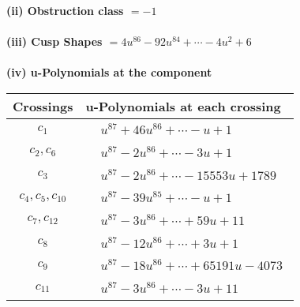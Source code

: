 \documentclass[1p]{elsarticle_modified}
\theoremstyle{definition}
\begin{document}
\flushleft \textbf{(ii) Obstruction class $= -1$}\\~\\
\flushleft \textbf{(iii) Cusp Shapes $= 4 u^{86}-92 u^{84}+\cdots-4 u^2+6$}\\~\\
\newpage\renewcommand{\arraystretch}{1}
\flushleft \textbf{(iv) u-Polynomials at the component}\newline \\
\begin{tabular}{m{50pt}|m{274pt}}
Crossings & \hspace{64pt}u-Polynomials at each crossing \\
\hline $$\begin{aligned}c_{1}\end{aligned}$$&$\begin{aligned}
&u^{87}+46 u^{86}+\cdots- u+1
\end{aligned}$\\
\hline $$\begin{aligned}c_{2},c_{6}\end{aligned}$$&$\begin{aligned}
&u^{87}-2 u^{86}+\cdots-3 u+1
\end{aligned}$\\
\hline $$\begin{aligned}c_{3}\end{aligned}$$&$\begin{aligned}
&u^{87}-2 u^{86}+\cdots-15553 u+1789
\end{aligned}$\\
\hline $$\begin{aligned}c_{4},c_{5},c_{10}\end{aligned}$$&$\begin{aligned}
&u^{87}-39 u^{85}+\cdots- u+1
\end{aligned}$\\
\hline $$\begin{aligned}c_{7},c_{12}\end{aligned}$$&$\begin{aligned}
&u^{87}-3 u^{86}+\cdots+59 u+11
\end{aligned}$\\
\hline $$\begin{aligned}c_{8}\end{aligned}$$&$\begin{aligned}
&u^{87}-12 u^{86}+\cdots+3 u+1
\end{aligned}$\\
\hline $$\begin{aligned}c_{9}\end{aligned}$$&$\begin{aligned}
&u^{87}-18 u^{86}+\cdots+65191 u-4073
\end{aligned}$\\
\hline $$\begin{aligned}c_{11}\end{aligned}$$&$\begin{aligned}
&u^{87}-3 u^{86}+\cdots-3 u+11
\end{aligned}$\\
\hline
\end{tabular}\\~\\
\end{document}
